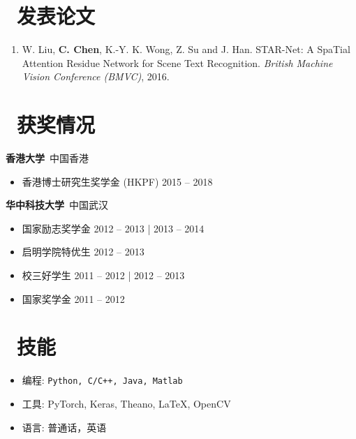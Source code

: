 \documentclass{resume}
\makeatletter
\newlength{\bibhang}
\newlength{\bibsep}
 {\@listi \global\bibsep\itemsep \global\advance\bibsep by\parsep}
\newenvironment{bibsection}%
        {\begin{enumerate}{}{%
       \setlength{\leftmargin}{\bibhang}%
       \setlength{\itemindent}{-\leftmargin}%
       \setlength{\itemsep}{\bibsep}%
       \setlength{\parsep}{\z@}%
        \setlength{\partopsep}{0pt}%
        \setlength{\topsep}{0pt}}}
        {\end{enumerate}\vspace{-.6\baselineskip}}
\makeatother
\begin{document}
\section{\faFileTextO\ 发表论文}

\begin{bibsection}
    \item W. Liu, \textbf{C. Chen}, K.-Y. K. Wong, Z. Su and J. Han. STAR-Net: A SpaTial Attention Residue Network for Scene Text Recognition. \emph{British Machine Vision Conference (BMVC)}, 2016.
\end{bibsection}
\vspace{.1in}

\section{\faTrophy\ 获奖情况}
\textbf{香港大学}~中国香港
\begin{itemize}
  \item 香港博士研究生奖学金 (HKPF) \hfill 2015 -- 2018
\end{itemize}

\vspace*{.1in}
\textbf{华中科技大学}~中国武汉
\begin{itemize}
  \item[\textbullet] 国家励志奖学金 \hfill 2012 -- 2013 | 2013 -- 2014
  \item[\textbullet] 启明学院特优生 \hfill 2012 -- 2013
  \item[\textbullet] 校三好学生 \hfill 2011 -- 2012 | 2012 -- 2013
  \item[\textbullet] 国家奖学金 \hfill 2011 -- 2012
\end{itemize}


\section{\faCogs\ 技能}
\begin{itemize}[parsep=0.5ex]
  \item 编程: \texttt{Python, C/C++, Java, Matlab}
  \item 工具: PyTorch, Keras, Theano, LaTeX, OpenCV
  \item 语言: 普通话，英语
\end{itemize}
\end{document}
